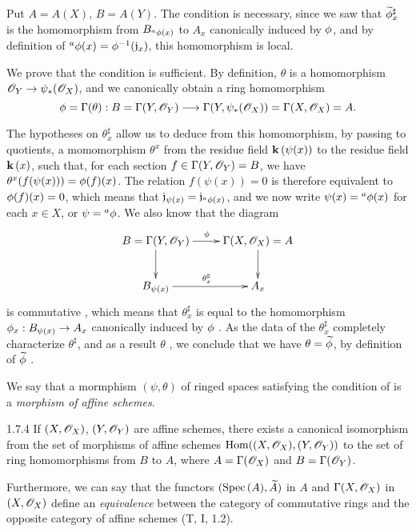 Put $A=A(X)$, $B=A(Y)$. The condition is necessary, since we saw  that
$\widetilde{\phi}_x^\sharp$ is the homomorphism from $B_{{}^a\phi(x)}$ to $A_x$ canonically
induced by $\phi$, and by definition of ${}^a\phi(x)=\phi^{-1}(\mathfrak{j}_x)$, this
homomorphism is local.

We prove that the condition is sufficient. By definition, $\theta$ is a homomorphism
$\mathscr{O}_Y\to\psi_*(\mathscr{O}_X)$, and we canonically obtain a ring homomorphism
\[
  \phi=\Gamma(\theta):B=\Gamma(Y,\mathscr{O}_Y)
  \longrightarrow\Gamma(Y,\psi_*(\mathscr{O}_X))=\Gamma(X,\mathscr{O}_X)=A.
\]

The hypotheses on $\theta_x^\sharp$ allow us to deduce from this homomorphism, by passing to
quotients, a momomorphism $\theta^x$ from the residue field $\mathbf{k}\,(\psi(x))$ to the residue
field $\mathbf{k}\,(x)$, such that, for each section $f\in\Gamma(Y,\mathscr{O}_Y)=B$, we have
$\theta^x(f(\psi(x)))=\phi(f)(x)$. The relation $f(\psi(x))=0$ is therefore equivalent to
$\phi(f)(x)=0$, which means that $\mathfrak{j}_{\psi(x)}=\mathfrak{j}_{{}^a\phi(x)}$, and
we now write $\psi(x)={}^a\phi(x)$ for each $x\in X$, or $\psi={}^a\phi$. We also know that
the diagram
\[
  \xymatrix{
    B=\Gamma(Y,\OO_Y)\ar[r]^\vphi\ar[d] &
    \Gamma(X,\OO_X)=A\ar[d]\\
    B_{\psi(x)}\ar[r]^{\theta_x^\sharp} &
    A_x
  }
\]
is commutative , which means that $\theta_x^\sharp$ is equal to the
homomorphism $\phi_x:B_{\psi(x)}\to A_x$ canonically induced by $\phi$ .
As the data of the $\theta_x^\sharp$ completely characterize $\theta^\sharp$, and as a result
$\theta$ , we conclude that we have $\theta=\widetilde{\phi}$, by
definition of $\widetilde{\phi}$ .

We say that a mormphism $(\psi,\theta)$ of ringed spaces satisfying the condition of
 is a \emph{morphism of affine schemes}.

\begin{envs}[Corollary]{1.7.4}
\label{cor-1.1.7.4}
If $(X,\mathscr{O}_X)$, $(Y,\mathscr{O}_Y)$ are affine schemes, there exists a canonical isomorphism from
the set of morphisms of affine schemes ${\mathop{\mathrm{Hom}}\nolimits}((X,\mathscr{O}_X),(Y,\mathscr{O}_Y))$ to the set of
ring homomorphisms from $B$ to $A$, where $A=\Gamma(\mathscr{O}_X)$ and $B=\Gamma(\mathscr{O}_Y)$.
\end{envs}

Furthermore, we can say that the functors $({\mathop{\mathrm{Spec}}\nolimits}\,(A),\widetilde{A})$ in $A$ and
$\Gamma(X,\mathscr{O}_X)$ in $(X,\mathscr{O}_X)$ define an \emph{equivalence} between the category of
commutative rings and the opposite category of affine schemes (T, I, 1.2).

